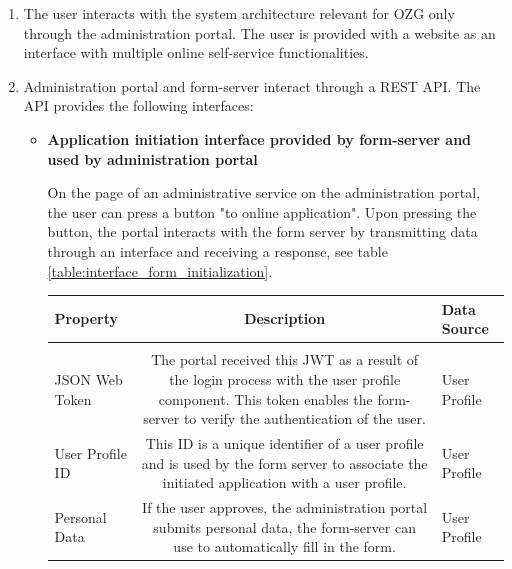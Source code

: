 \documentclass[
     12pt,         %
     a4paper,      %
     BCOR=10mm,version=first,     %
     DIV=14,version=first,        %
     ]{scrreprt}
\begin{document}
\begin{enumerate}
    \item The user interacts with the system architecture relevant for OZG only through the administration portal. The user is provided with a website as an interface with multiple online self-service functionalities.
    \item Administration portal and form-server interact through a REST API. The API provides the following interfaces:
    \begin{itemize}
        \item \textbf{Application initiation interface provided by form-server and used by administration portal}
        
        On the page of an administrative service on the administration portal, the user can press a button "to online application". Upon pressing the button, the portal interacts with the form server by transmitting data through an interface and receiving a response, see table \ref{table:interface_form_initialization}.
        
        \begin{table}[!h]
            \begin{tabularx}{\textwidth}{|l|C|l|}
            \hline
            Property & Description & Data Source \\
            \hline
             \\
            \hline
            
            JSON Web Token & The portal received this JWT as a result of the login process with the user profile component. This token enables the form-server to verify the authentication of the user. & User Profile \\
            
            \hline
            
            User Profile ID & This ID is a unique identifier of a user profile and is used by the form server to associate the initiated application with a user profile. & User Profile \\
            
            \hline
            
            Personal Data & If the user approves, the administration portal submits personal data, the form-server can use to automatically fill in the form. & User Profile \\
            
            \hline
            

\end{tabularx}
\end{table}
\end{itemize}
\end{enumerate}
\end{document}
